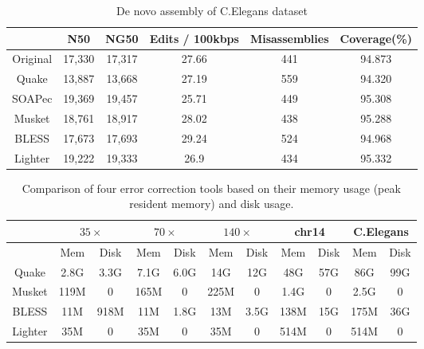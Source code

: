 \documentclass{bmcart}
\begin{document}
\begin{backmatter}
\begin{table}[h!] %
\caption{De novo assembly of C.Elegans dataset}
\begin{tabular}{|c|c|c|c|c|c|} \hline
	   & N50 &	NG50	& Edits / 100kbps &	Misassemblies	& Coverage(\%) \\ \hline
Original &	17,330	& 17,317	& 27.66	& 441& 	94.873 \\ \hline
Quake	&	13,887	& 13,668	& 27.19	& 559	& 94.320 \\ \hline
SOAPec  & 19,369	& 19,457	& 25.71	& 449	& 95.308 \\ \hline
Musket	&	18,761	& 18,917	& 28.02	& 438	& 95.288 \\ \hline
BLESS	&	17,673	& 17,693	& 29.24	& 524	& 94.968 \\ \hline
Lighter	&	19,222	& 19,333	& 26.9	& 434	& 95.332 \\ \hline
\end{tabular}
\end{table}

\begin{table}[h!] %
\caption{Comparison of four error correction tools based on their memory usage (peak resident memory) and disk usage.\label{table:memory_usage}}
\begin{tabular}{|c|c|c||c|c||c|c||c|c||c|c|} \hline
		& \multicolumn{2}{|c||}{$35\times$} & \multicolumn{2}{|c||}{$70\times$}  & \multicolumn{2}{|c||}{$140\times$} & \multicolumn{2}{|c||}{chr14}  & \multicolumn{2}{|c|}{C.Elegans} \\ \hline
		& Mem & Disk & Mem & Disk & Mem & Disk & Mem & Disk & Mem & Disk \\ \hline
Quake   & 2.8G	& 3.3G & 7.1G & 6.0G & 14G & 12G & 48G & 57G & 86G & 99G \\ \hline		
Musket	& 119M	& 0 & 165M & 0 & 225M & 0 & 1.4G & 0 & 2.5G & 0 \\ \hline
BLESS	& 11M	& 918M & 11M & 1.8G & 13M & 3.5G & 138M & 15G & 175M & 36G \\ \hline
Lighter	& 35M	& 0 & 35M & 0 & 35M & 0 & 514M & 0 & 514M & 0 \\ \hline
\end{tabular}
\end{table}

\end{backmatter}
\end{document}
